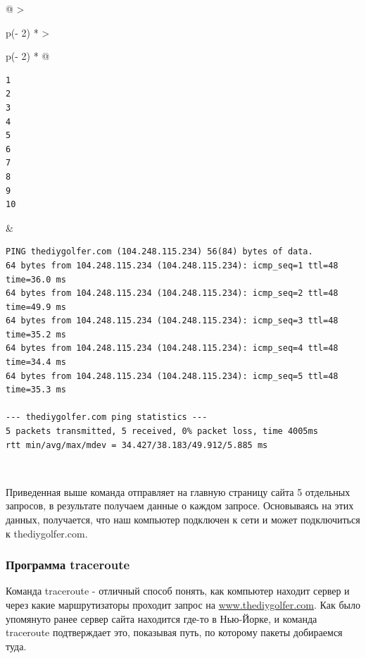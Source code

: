 \documentclass{article}
\begin{document}
\begin{longtable}[]{@{}
  >{\raggedright\arraybackslash}p{(\columnwidth - 2\tabcolsep) * }
  >{\raggedright\arraybackslash}p{(\columnwidth - 2\tabcolsep) * }@{}}
\toprule
\endhead
\begin{minipage}[t]{\linewidth}\raggedright
\begin{verbatim}
1
2
3
4
5
6
7
8
9
10
\end{verbatim}
\end{minipage} & \begin{minipage}[t]{\linewidth}\raggedright
\begin{verbatim}
PING thediygolfer.com (104.248.115.234) 56(84) bytes of data.
64 bytes from 104.248.115.234 (104.248.115.234): icmp_seq=1 ttl=48 time=36.0 ms
64 bytes from 104.248.115.234 (104.248.115.234): icmp_seq=2 ttl=48 time=49.9 ms
64 bytes from 104.248.115.234 (104.248.115.234): icmp_seq=3 ttl=48 time=35.2 ms
64 bytes from 104.248.115.234 (104.248.115.234): icmp_seq=4 ttl=48 time=34.4 ms
64 bytes from 104.248.115.234 (104.248.115.234): icmp_seq=5 ttl=48 time=35.3 ms

--- thediygolfer.com ping statistics ---
5 packets transmitted, 5 received, 0% packet loss, time 4005ms
rtt min/avg/max/mdev = 34.427/38.183/49.912/5.885 ms
\end{verbatim}
\end{minipage} \\ \addlinespace
\bottomrule
\end{longtable}

Приведенная выше команда отправляет на главную страницу сайта 5
отдельных запросов, в результате получаем данные о каждом запросе.
Основываясь на этих данных, получается, что наш компьютер подключен к
сети и может подключиться к thediygolfer.com.

\hypertarget{traceroute}{%
\subsubsection{\texorpdfstring{\protect\hyperlink{traceroute}{}Программа
traceroute}{Программа traceroute}}\label{traceroute}}

Команда traceroute - отличный способ понять, как компьютер находит
сервер и через какие маршрутизаторы проходит запрос на
\href{http://www.thediygolfer.com}{www.thediygolfer.com}. Как было
упомянуто ранее сервер сайта находится где-то в Нью-Йорке, и команда
traceroute подтверждает это, показывая путь, по которому пакеты
добираемся туда.
\end{document}
